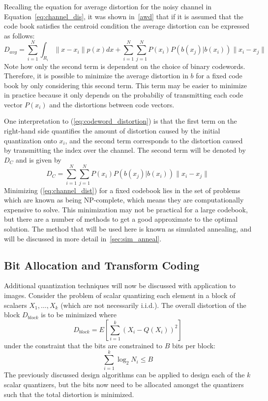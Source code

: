 Recalling the equation for average distortion for the noisy channel in Equation~\ref{eq:channel_dis}, it was shown in~\ref{awd} that  if it is assumed that the code book satisfies the centroid condition the average distortion can be expressed as follows:
\begin{equation}
\label{eq:codeword_distortion}
D_{avg}  = \sum_{i=1}^N \int_{R_i} \|x - x_i\|p(x)dx + \sum_{i=1}^N \sum_{j=1}^N P(x_i) P(b(x_j)|b(x_i)) \|x_i - x_j\|
\end{equation}
Note how only the second term is dependent on the choice of binary codewords. Therefore, it is possible to minimize the average distortion in $b$ for a fixed code book by only considering this second term. This term may be easier to minimize in practice because it only depends on the probabiliy of transmitting each code vector $P(x_i)$ and the distortions between code vectors.

One interpretation to (\ref{eq:codeword_distortion}) is that the first term on the right-hand side quantifies the amount of distortion caused by the initial quantization onto $x_i$, and the second term corresponds to the distortion caused by transmitting the index over the channel. The second term will be denoted by $D_C$ and is given by
\begin{equation}
  \label{eq:channel_dist}
D_C = \sum_{i=1}^N \sum_{j=1}^N P(x_i) P(b(x_j)|b(x_i)) \|x_i - x_j\|
\end{equation}
Minimizing (\ref{eq:channel_dist}) for a fixed codebook lies in the set of problems which are known as being NP-complete, which means they are computationally expensive to solve. This minimization may not be practical for a large codebook, but there are a number of methods to get a good approximate to the optimal solution. The method that will be used here is known as simulated annealing, and will be discussed in more detail in~\ref{sec:sim_anneal}.

\subsection{Bit Allocation and Transform Coding}
\label{sec:bit_alloc}
Additional quantization techniques will now be discussed with application to images. Consider the problem of scalar quantizing each element in a block of scalaers $X_1,\ldots,X_k$ (which are not necessarily i.i.d.). The overall distortion of the block $D_{block}$ is to be minimized where
\begin{equation}
D_{block} = E[\sum_{i=1}^k(X_i - Q(X_i))^2]
\end{equation}
under the constraint that the bits are constrained to $B$ bits per block:
\begin{equation}
\sum_{i=1}^k \log_2 N_i \le B
\end{equation}
The previously discussed design algorithms can be applied to design each of the $k$ scalar quantizers, but the bits now need to be allocated amongst the quantizers such that the total distortion is minimized.

